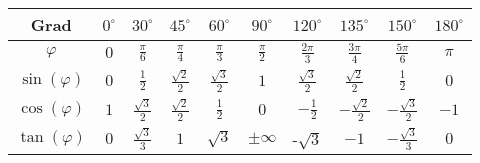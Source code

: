 \begin{comment}
            xmin=0,
            ymin=-1.2,
            xmax=6.5,
            ymax=1.2,
            legend entries = {$\sin(x)$, $\sin(x)^2$, $\sin(x)^3$, $\sin(x^2)$, $\sin(\sin(x))$, $\cos(\cos(x))$},
            legend style = {
                anchor = north west, 
                font = \footnotesize,
            }
        ]
            \addplot[domain=0:6.28, opacity = 0.5] {sin(deg(x))};
            \addplot[domain=0:6.28, thick, mred] {sin(deg(x))^2};
            \addplot[domain=0:6.28, thick, darkblue] {sin(deg(x))^3};
            \addplot[domain=0:6.28, thick, opacity = 0.7, burntorange] {sin(deg(x^2))};
            \addplot[domain=0:6.28, thick, darkgreen] {sin(deg(sin(deg(x))))};
            \addplot[domain=0:6.28, thick, pastelaqua] {cos(deg(cos(deg(x))))};
        \end{axis}
    \end{tikzpicture}
\end{flushleft}
\end{comment}
 \begin{center}
    \renewcommand{\arraystretch}{1.3} %
    \setlength{\tabcolsep}{4pt}
    \begin{tabular}{|c|c|c|c|c|c|c|c|c|c|}
        \hline
        Grad            & $0^\circ$ & $30^\circ$           & $45^\circ$           & $60^\circ$           & $90^\circ$      & $120^\circ$          & $135^\circ$           & $150^\circ$           & $180^\circ$ \\
        \hline
        $\varphi$       & $0$       & $\frac{\pi}{6}$      & $\frac{\pi}{4}$      & $\frac{\pi}{3}$      & $\frac{\pi}{2}$ & $\frac{2\pi}{3}$     & $\frac{3\pi}{4}$      & $\frac{5\pi}{6}$      & $\pi$       \\
        \hline
        $\sin(\varphi)$ & $0$       & $\frac{1}{2}$        & $\frac{\sqrt{2}}{2}$ & $\frac{\sqrt{3}}{2}$ & $1$             & $\frac{\sqrt{3}}{2}$ & $\frac{\sqrt{2}}{2}$  & $\frac{1}{2}$         & $0$         \\
        \hline
        $\cos(\varphi)$ & $1$       & $\frac{\sqrt{3}}{2}$ & $\frac{\sqrt{2}}{2}$ & $\frac{1}{2}$        & $0$             & $-\frac{1}{2}$       & $-\frac{\sqrt{2}}{2}$ & $-\frac{\sqrt{3}}{2}$ & $-1$        \\
        \hline
        $\tan(\varphi)$ & $0$       & $\frac{\sqrt{3}}{3}$ & $1$                  & $\sqrt{3}$           & $\pm \infty$    & -$\sqrt{3}$          & $-1$                  & $-\frac{\sqrt{3}}{3}$ & $0$         \\
        \hline
    \end{tabular}
\end{center}

